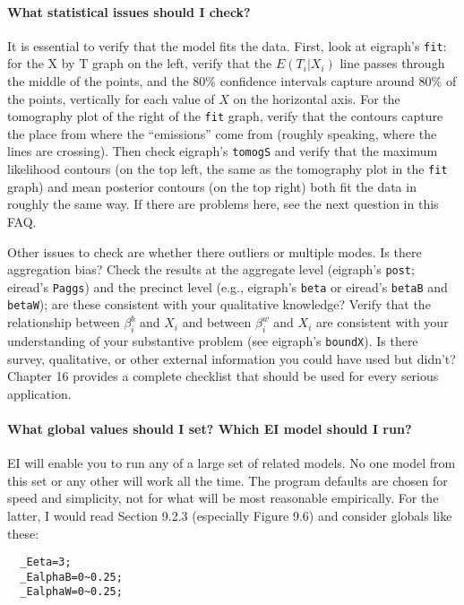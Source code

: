 \documentclass[11pt,titlepage]{article}
\begin{document}
\paragraph{What statistical issues should I check?}
It is essential to verify that the model fits the data.  First, look
at eigraph's \texttt{fit}: for the X by T graph on the left, verify
that the $E(T_i|X_i)$ line passes through the middle of the points,
and the 80\% confidence intervals capture around 80\% of the points,
vertically for each value of $X$ on the horizontal axis.  For the
tomography plot of the right of the \texttt{fit} graph, verify that
the contours capture the place from where the ``emissions'' come from
(roughly speaking, where the lines are crossing).  Then check
eigraph's \texttt{tomogS} and verify that the maximum likelihood
contours (on the top left, the same as the tomography plot in the
\texttt{fit} graph) and mean posterior contours (on the top right)
both fit the data in roughly the same way.  If there are problems
here, see the next question in this FAQ.

Other issues to check are whether there outliers or multiple modes. Is
there aggregation bias?  Check the results at the aggregate level
(eigraph's \texttt{post}; eiread's \texttt{Paggs}) and the precinct
level (e.g., eigraph's \texttt{beta} or eiread's \texttt{betaB} and
\texttt{betaW}); are these consistent with your qualitative knowledge?
Verify that the relationship between $\beta_i^b$ and $X_i$ and between
$\beta_i^w$ and $X_i$ are consistent with your understanding of your
substantive problem (see eigraph's \texttt{boundX}).  Is there survey,
qualitative, or other external information you could have used but
didn't?  Chapter 16 provides a complete checklist that should be used
for every serious application.

\paragraph{What global values should I set?  Which EI model should I run?}
EI will enable you to run any of a large set of related models.  No
one model from this set or any other will work all the time.  The
program defaults are chosen for speed and simplicity, not for what
will be most reasonable empirically.  For the latter, I would read
Section 9.2.3 (especially Figure 9.6) and consider globals like these:
\begin{verbatim}
  _Eeta=3;
  _EalphaB=0~0.25;
  _EalphaW=0~0.25;
\end{verbatim}
\end{document}
